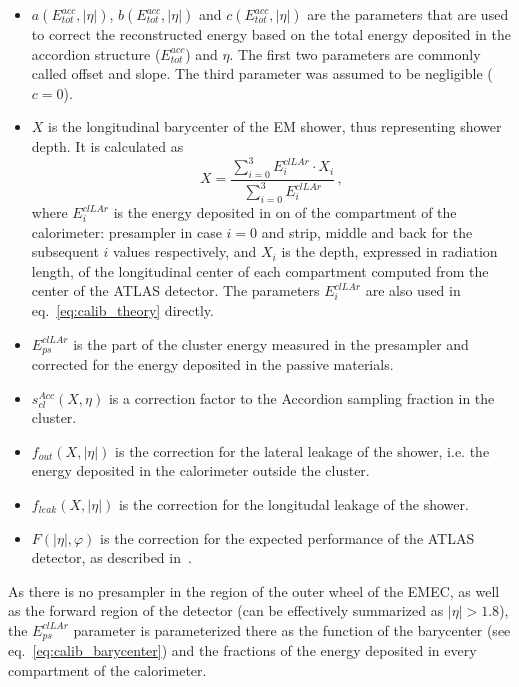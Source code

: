 \begin{itemize}
\item $a(E^{acc}_{tot}, |\eta|)$, $b (E^{acc}_{tot}, |\eta|)$ and $c (E^{acc}_{tot}, |\eta|)$ are the parameters that are used to correct the reconstructed energy based on the total energy deposited in the accordion structure ($E^{acc}_{tot}$) and $\eta$. The first two parameters are commonly called offset and slope. The third parameter was assumed to be negligible ($c=0$).
\item $X$ is the longitudinal barycenter of the EM shower, thus representing shower depth. It is calculated as
\begin{equation}
\label{eq:calib_barycenter}
X = \frac{\sum\limits^{3}_{i=0}E^{clLAr}_{i} \cdot X_{i}}{\sum\limits^{3}_{i=0}E^{clLAr}_{i}} \,,
\end{equation}
where $E^{clLAr}_{i}$ is the energy deposited in on of the compartment of the calorimeter: presampler in case $i=0$ and strip, middle and back for the subsequent $i$ values respectively, and $X_{i}$ is the depth, expressed in radiation length, of the longitudinal center of each compartment computed from the center of the ATLAS detector. The parameters $E^{clLAr}_{i}$ are also used in eq.~\ref{eq:calib_theory} directly.
\item $E^{clLAr}_{ps}$ is the part of the cluster energy measured in the presampler and corrected for the energy deposited in the passive materials.
\item $s^{Acc}_{cl}(X,\eta)$ is a correction factor to the Accordion sampling fraction in the cluster.
\item $f_{out}(X,|\eta|)$ is the correction for the lateral leakage of the shower, i.e. the energy deposited in the calorimeter outside the cluster.
\item $f_{leak}(X,|\eta|)$ is the correction for the longitudal leakage of the shower.
\item $F(|\eta|,\varphi)$ is the correction for the expected performance of the ATLAS detector, as described in~\cite{lib:ATLAS_perf}.
\end{itemize}

As there is no presampler in the region of the outer wheel of the EMEC, as well as the forward region of the detector (can be effectively summarized as $|\eta|>1.8$), the $E^{clLAr}_{ps}$ parameter is parameterized there as the function of the barycenter (see eq.~\ref{eq:calib_barycenter}) and the fractions of the energy deposited in every compartment of the calorimeter.

